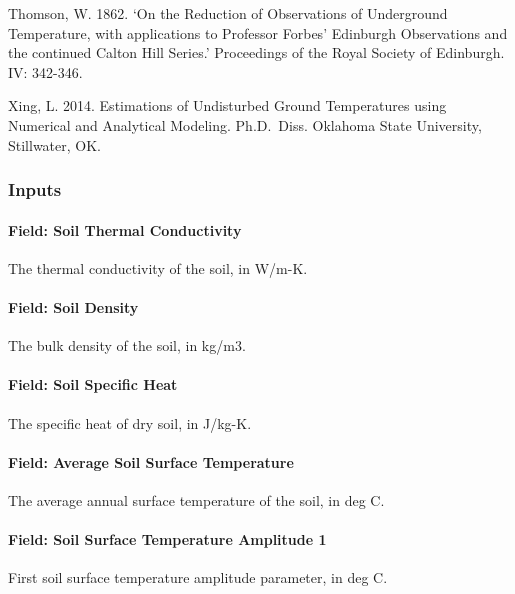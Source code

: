Thomson, W. 1862. `On the Reduction of Observations of Underground Temperature, with applications to Professor Forbes' Edinburgh Observations and the continued Calton Hill Series.' Proceedings of the Royal Society of Edinburgh. IV: 342-346.

Xing, L. 2014. Estimations of Undisturbed Ground Temperatures using Numerical and Analytical Modeling. Ph.D.~Diss. Oklahoma State University, Stillwater, OK.

\subsubsection{Inputs}\label{inputs-15-007}

\paragraph{Field: Soil Thermal Conductivity}\label{field-soil-thermal-conductivity-2}

The thermal conductivity of the soil, in W/m-K.

\paragraph{Field: Soil Density}\label{field-soil-density-2}

The bulk density of the soil, in kg/m3.

\paragraph{Field: Soil Specific Heat}\label{field-soil-specific-heat-2}

The specific heat of dry soil, in J/kg-K.

\paragraph{Field: Average Soil Surface Temperature}\label{field-average-soil-surface-temperature-000}

The average annual surface temperature of the soil, in deg C.

\paragraph{Field: Soil Surface Temperature Amplitude 1}\label{field-soil-surface-temperature-amplitude-1}

First soil surface temperature amplitude parameter, in deg C.

